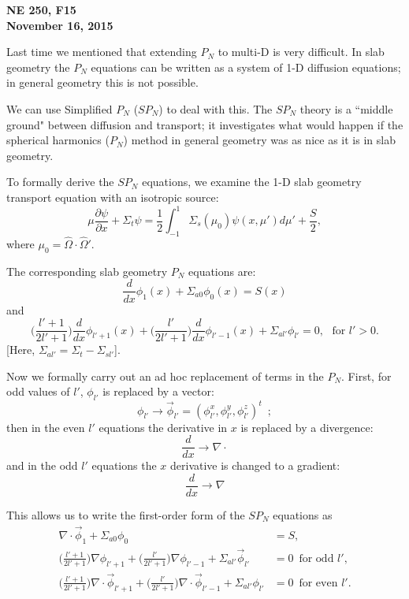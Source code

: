 \documentclass[12pt]{article}
\newcommand{\omvec}{\ensuremath{\hat{\Omega}}}
\begin{document}
\begin{center}
{\bf NE 250, F15\\
November 16, 2015 
}
\end{center}



Last time we mentioned that extending $P_N$ to multi-D is very difficult. In
slab geometry the $P_N$ equations can be written as a system of 1-D
diffusion equations; in general geometry this is not possible. 

We can use Simplified $P_N$ ($SP_N$) to deal with this. The $SP_N$ theory is a ``middle ground" between diffusion and transport; it investigates what
would happen if the spherical harmonics ($P_N$) method in general
geometry was as nice as it is in slab geometry.

To formally derive the $SP_N$ equations, we examine the 1-D slab geometry transport equation with an isotropic source:
\[
\mu\frac{\partial\psi}{\partial x} + \Sigma_t\psi = \frac{1}{2}\int_{-1}^1\Sigma_s(\mu_0)\psi(x,\mu')d\mu' + \frac{S}{2},
\]
where $\mu_0 = \omvec\cdot\omvec'$.

The corresponding slab geometry $P_N$ equations are:
\[
\frac{d}{dx}\phi_1(x) + \Sigma_{a0}\phi_0(x) = S(x)
\]
and
\[
\bigl(\frac{l'+1}{2l'+1}\bigr)\frac{d}{d x}\phi_{l'+1}(x) + \bigl(\frac{l'}{2l'+1}\bigr)\frac{d}{d x}\phi_{l'-1}(x) + \Sigma_{al'} \phi_{l'} =  0, \,\,\,\, \text{for $l'>0$}.
\]
[Here, $\Sigma_{al'} = \Sigma_t-\Sigma_{sl'}$].

Now we formally carry out an ad hoc
replacement of terms in the $P_N$. First, for odd values of
$l'$, $\phi_{l'}$ is replaced by a vector:
\[
\phi_{l'}\rightarrow \vec\phi_{l'} = (\phi_{l'}^x,\phi_{l'}^y,\phi_{l'}^z)^t\,\,\,;
\]
then in the even $l'$ equations the derivative in $x$ is replaced by a divergence:
\[
\frac{d}{dx} \rightarrow \nabla \cdot
\]
and in the odd $l'$ equations the $x$ derivative is changed to a gradient:
\[
\frac{d}{dx} \rightarrow \nabla
\]

This allows us to write the first-order form of the $SP_N$ equations as
\[
\begin{split}
\nabla\cdot\vec\phi_1 + \Sigma_{a0}\phi_0 &= S, \\
\bigl(\frac{l'+1}{2l'+1}\bigr)\nabla\phi_{l'+1} + \bigl(\frac{l'}{2l'+1}\bigr)\nabla\phi_{l'-1} + \Sigma_{al'} \vec\phi_{l'} &=  0 \,\,\, \text{for odd $l'$},\\
\bigl(\frac{l'+1}{2l'+1}\bigr)\nabla\cdot\vec\phi_{l'+1} + \bigl(\frac{l'}{2l'+1}\bigr)\nabla\cdot\vec\phi_{l'-1} + \Sigma_{al'} \phi_{l'} &=  0 \,\,\, \text{for even $l'$}.
\end{split}
\]
\end{document}
